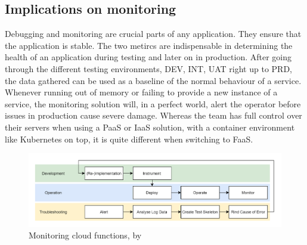\documentclass[11pt]{article}
\begin{document}
\subsection{Implications on monitoring}
Debugging and monitoring are crucial parts of any application. They ensure that the application is stable. The two metircs are indispensable in determining the health of an application during testing and later on in production. After going through the different testing environments, DEV, INT, UAT right up to PRD, the data gathered can be used as a baseline of the normal behaviour of a service. Whenever running out of memory or failing to provide a new instance of a service, the monitoring solution will, in a perfect world, alert the operator before issues in production cause severe damage. Whereas the team has full control over their servers when using a PaaS or IaaS solution, with a container environment like Kubernetes on top, it is quite different when switching to FaaS.
\begin{figure}[H]
\caption{Monitoring cloud functions, by \cite{manner2019troubleshooting}}
\label{fig:manner}
\centering
\includegraphics[width=1\textwidth]{monitoring}
\end{figure}
\end{document}
